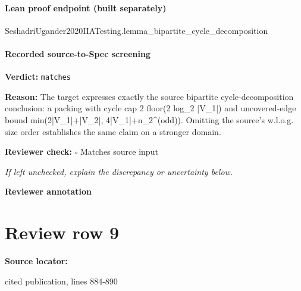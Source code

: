 \documentclass[10pt]{article}
\newcommand{\reviewerbox}{%
  \par\noindent\fbox{\parbox{0.96\linewidth}{\rule{0pt}{0.38in}}}\par
}
\newcommand{\reviewmatch}[1]{%
  \par\noindent\textbf{Reviewer check:} $\square$\; #1\par
  \noindent\emph{If left unchecked, explain the discrepancy or uncertainty below.}\par
}
\begin{document}
\paragraph{Lean proof endpoint (built separately)}\begin{ReviewVerbatim}
SeshadriUgander2020IIATesting.lemma_bipartite_cycle_decomposition
\end{ReviewVerbatim}

\paragraph{Recorded source-to-Spec screening}
\textbf{Verdict:} \texttt{matches}
\\
{\raggedright
\textbf{Reason:} The target expresses exactly the source bipartite cycle-\allowbreak{}decomposition conclusion:\allowbreak{} a packing with cycle cap 2 floor(2 log\_\allowbreak{}2 |V\_\allowbreak{}1|) and uncovered-\allowbreak{}edge bound min(2|V\_\allowbreak{}1|+|V\_\allowbreak{}2|, 4|V\_\allowbreak{}1|+n\_\allowbreak{}2\textasciicircum{}(odd)).\allowbreak{} Omitting the source's w.\allowbreak{}l.\allowbreak{}o.\allowbreak{}g.\allowbreak{} size order establishes the same claim on a stronger domain.\allowbreak{}
\par}
\reviewmatch{Matches source input}
\noindent\textbf{Reviewer annotation}\par
\reviewerbox
\clearpage
\hypertarget{source-claim-210099b0ca9e6006}{}
\section*{Review row 9}
\textbf{Source locator:} {\footnotesize\raggedright cited publication, lines 884-\allowbreak{}890\par}
\end{document}
